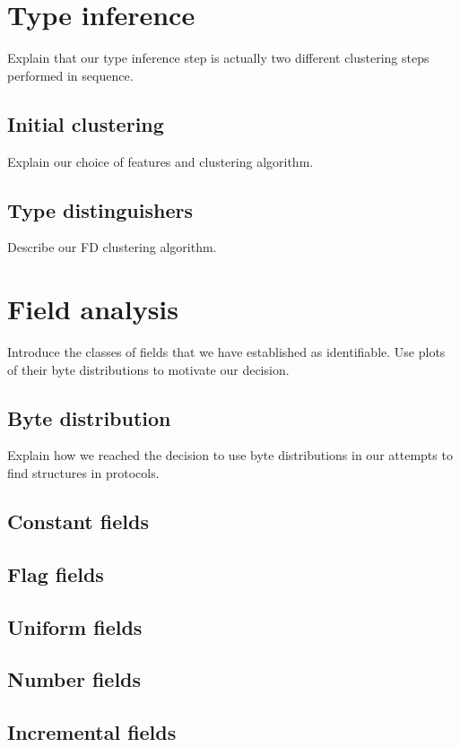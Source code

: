 \documentclass[a4paper]{report}
\begin{document}
\section{Type inference}
Explain that our type inference step is actually two different clustering steps
performed in sequence.

\subsection{Initial clustering}
Explain our choice of features and clustering algorithm.

\subsection{Type distinguishers}
Describe our FD clustering algorithm.

\section{Field analysis}
Introduce the classes of fields that we have established as identifiable. Use
plots of their byte distributions to motivate our decision.

\subsection{Byte distribution}
Explain how we reached the decision to use byte distributions in our attempts
to find structures in protocols.

\subsection{Constant fields}

\subsection{Flag fields}

\subsection{Uniform fields}

\subsection{Number fields}

\subsection{Incremental fields}
\end{document}
